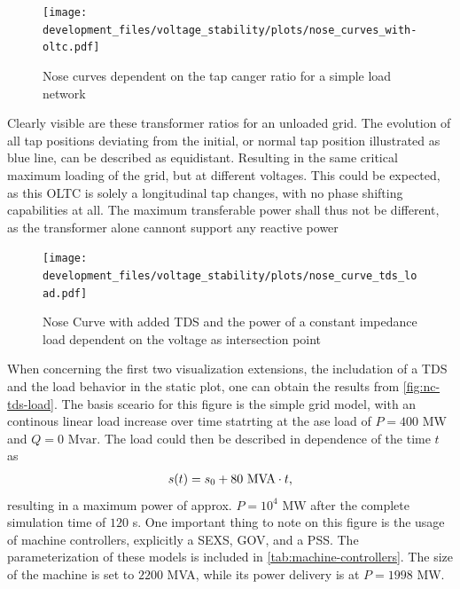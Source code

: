 \begin{figure}[htbp!]
    \centering
    \texttt{[image: development\_files/voltage\_stability/plots/nose\_curves\_with-oltc.pdf]}
    \caption[Nose curves dependent on the tap changer ratio for a simple load network]{Nose curves dependent on the tap canger ratio for a simple load network}
    \label{fig:oltc-nose-curve}
\end{figure}

Clearly visible are these transformer ratios for an unloaded grid.
The evolution of all tap positions deviating from the initial, or normal tap position illustrated as blue line, can be described as equidistant.
Resulting in the same critical maximum loading of the grid, but at different voltages.
This could be expected, as this \acs{OLTC} is solely a longitudinal tap changes, with no phase shifting capabilities at all.
The maximum transferable power shall thus not be different, as the transformer alone cannont support any reactive power

\begin{figure}[htbp!]
    \centering
    \texttt{[image: development\_files/voltage\_stability/plots/nose\_curve\_tds\_load.pdf]}
    \caption{Nose Curve with added \acs{TDS} and the power of a constant impedance load dependent on the voltage as intersection point}
    \label{fig:nc-tds-load}
\end{figure}

When concerning the first two visualization extensions, the includation of a \acs{TDS} and the load behavior in the static plot, one can obtain the results from \autoref{fig:nc-tds-load}.
The basis sceario for this figure is the simple grid model, with an continous linear load increase over time statrting at the ase load of $P=400\text{ MW}$ and $Q=0\text{ Mvar}$.
The load could then be described in dependence of the time $t$ as 
\begin{align}
    s(t) = s_0 + 80\text{ MVA} \cdot t \notag,
\end{align}
resulting in a maximum power of approx. $P=10^4\text{ MW}$ after the complete simulation time of $120$ s.
One important thing to note on this figure is the usage of machine controllers, explicitly a \ac{SEXS}, \ac{GOV}, and a \ac{PSS}.
The parameterization of these models is included in \autoref{tab:machine-controllers}.
The size of the machine is set to $2200$ MVA, while its power delivery is at $P=1998$ MW.


